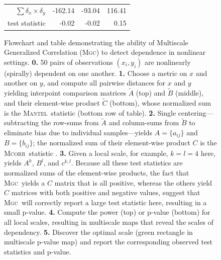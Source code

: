 \documentclass[11pt]{article}
\providecommand{\sct}[1]{{\normalfont\textsc{#1}}}
\newcommand{\G}{c}
\newcommand{\Mgc}{\sct{Mgc}}
\newcommand{\Mcorr}{\sct{Mcorr}}
\newcommand{\Mantel}{\sct{Mantel}}
\begin{document}
\begin{figure}[htbp]
\begin{tabular}{r  r   r   r}
\hline
 $\sum{\delta_x \times \delta_y}$ & \color{magenta}-162.14   & \color{magenta}-93.04 & \color{green}116.41  \\ 
 test statistic &  \color{magenta}-0.02  & \color{magenta}-0.02 & \color{green}0.15  \\  
\end{tabular}
\caption{
Flowchart  and table demonstrating the ability of Multiscale Generalized Correlation (\Mgc) to detect dependence in nonlinear settings. 
%
%
%
\textbf{0.} 50 pairs of observations $(x_i,y_i)$ are nonlinearly (spirally) dependent on one another.
% 
\textbf{1.} Choose a metric on $x$ and another on $y$, and compute all pairwise distances for $x$ and $y$ yielding interpoint comparison matrices
 $\tilde{A}$ (top) and $\tilde{B}$ (middle), 
and their element-wise product $\tilde{C}$ (bottom), whose normalized sum is the  \Mantel~statistic \cite{Mantel1967} (bottom row of table).
% 
\textbf{2.} Single centering---subtracting the row-sums from $\tilde{A}$ and column-sums from $\tilde{B}$ to eliminate bias due to individual samples---yields $A=\{a_{ij}\}$ and $B=\{b_{ij}\}$; the normalized sum of their  element-wise product  $C$ is the  \Mcorr~statistic \cite{SzekelyRizzo2013a}.
% 
\textbf{3.} Given a local scale, for example, $k=l=4$ here, yields $A^{k}$, $B^{l}$, and $\G^{k,l}$.  Because all these test statistics are normalized sums of the element-wise products, the fact that \Mgc~yields a $C$ matrix that is all positive, whereas the others yield $C$ matrices with both positive and negative values, suggest that \Mgc~will correctly report a large test statistic here, resulting in a small p-value.
\textbf{4.} Compute the power (top) or p-value (bottom) for all local scales, resulting in multiscale maps that reveal the  scales of dependency. 
\textbf{5.} Discover the optimal scale (green rectangle in multiscale p-value map) and report the corresponding observed test statistics and p-value. 
}
\end{figure}
\end{document}
